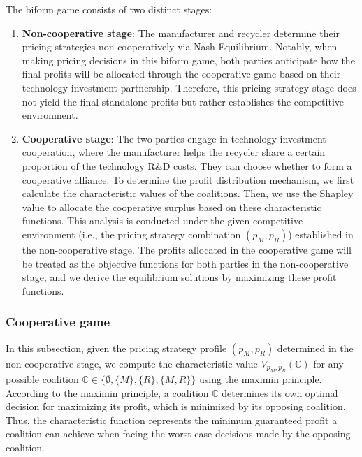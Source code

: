\documentclass[authoryear,preprint,review,times,10pt]{elsarticle}
\begin{document}
The biform game consists of two distinct stages:

\begin{enumerate}[label={(\arabic*)}]
\item \textbf{Non-cooperative stage}: The manufacturer and recycler determine their pricing strategies non-cooperatively via Nash Equilibrium. Notably, when making pricing decisions in this biform game, both parties anticipate how the final profits will be allocated through the cooperative game based on their technology investment partnership. Therefore, this pricing strategy stage does not yield the final standalone profits but rather establishes the competitive environment.

\item \textbf{Cooperative stage}: The two parties engage in technology investment cooperation, where the manufacturer helps the recycler share a certain proportion of the technology R\&D costs. They can choose whether to form a cooperative alliance. To determine the profit distribution mechanism, we first calculate the characteristic values of the coalitions. Then, we use the Shapley value to allocate the cooperative surplus based on these characteristic functions. This analysis is conducted under the given competitive environment (i.e., the pricing strategy combination $(p_M, p_R)$) established in the non-cooperative stage. The profits allocated in the cooperative game will be treated as the objective functions for both parties in the non-cooperative stage, and we derive the equilibrium solutions by maximizing these profit functions.
\end{enumerate}

\subsubsection{Cooperative game}
\label{sec:cooperative_game}

In this subsection, given the pricing strategy profile $(p_M, p_R)$ determined in the non-cooperative stage, we compute the characteristic value $V_{p_M,p_R}(\mathbb{C})$ for any possible coalition $\mathbb{C} \in \{\emptyset, \{M\}, \{R\}, \{M,R\}\}$ using the maximin principle. According to the maximin principle, a coalition $\mathbb{C}$ determines its own optimal decision for maximizing its profit, which is minimized by its opposing coalition. Thus, the characteristic function represents the minimum guaranteed profit a coalition can achieve when facing the worst-case decisions made by the opposing coalition.
\end{document}
